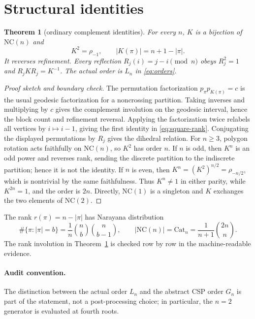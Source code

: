 \documentclass[11pt]{article}
\newtheorem{theorem}{Theorem}[section]
\theoremstyle{definition}
\newcommand{\NC}{\mathrm{NC}}
\newcommand{\Cat}{\mathrm{Cat}}
\begin{document}
\section{Structural identities}

\begin{theorem}[ordinary complement identities]\label{thm:struct}
For every $n$, $K$ is a bijection of $\NC(n)$ and
\begin{equation}
 K^2=\rho_{-1},\qquad |K(\pi)|=n+1-|\pi|.
 \label{eq:square-rank}
\end{equation}
It reverses refinement.  Every reflection $R_j(i)=j-i\pmod n$ obeys
$R_j^2=1$ and $R_jKR_j=K^{-1}$.  The actual order is $L_n$ in
\eqref{eq:orders}.
\end{theorem}

\begin{proof}[Proof sketch and boundary check]
The permutation factorization $p_\pi p_{K(\pi)}=c$ is the usual geodesic
factorization for a noncrossing partition.  Taking inverses and multiplying by
$c$ gives the complement involution on the geodesic interval, hence the block
count and refinement reversal.  Applying the factorization twice relabels all
vertices by $i\mapsto i-1$, giving the first identity in \eqref{eq:square-rank}.
Conjugating the displayed permutations by $R_j$ gives the dihedral relation.
For $n\ge3$, polygon rotation acts faithfully on $\NC(n)$, so $K^2$ has order
$n$.  If $n$ is odd, then $K^n$ is an odd power and reverses rank, sending the
discrete partition to the indiscrete partition; hence it is not the identity.
If $n$ is even, then $K^n=(K^2)^{n/2}=\rho_{-n/2}$, which is nontrivial by the
same faithfulness.  Thus $K^n\ne1$ in either parity, while $K^{2n}=1$, and the
order is $2n$.  Directly,
$\NC(1)$ is a singleton and $K$ exchanges the two elements of $\NC(2)$.
\end{proof}

The rank $r(\pi)=n-|\pi|$ has Narayana distribution
\begin{equation}
 \#\{\pi:|\pi|=b\}=\frac{1}{n}\binom{n}{b}\binom{n}{b-1},
 \qquad |\NC(n)|=\Cat_n=\frac{1}{n+1}\binom{2n}{n}.       \label{eq:narayana}
\end{equation}
The rank involution in Theorem~\ref{thm:struct} is checked row by row in the
machine-readable evidence.

\paragraph{Audit convention.}
The distinction between the actual order $L_n$ and the abstract CSP order
$G_n$ is part of the statement, not a post-processing choice; in particular,
the $n=2$ generator is evaluated at fourth roots.
\end{document}

